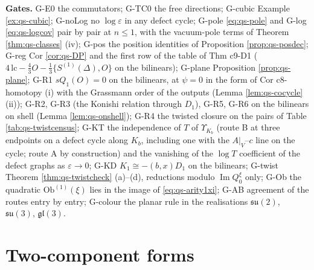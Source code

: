 \documentclass[11pt]{article}
\numberwithin{equation}{section}
\theoremstyle{plain}
\theoremstyle{definition}
\newcommand{\AV}{A|_V}
\begin{document}
\textbf{Gates.} G-E0 the commutators; G-TC0 the free directions; G-cubic Example \ref{ex:qs-cubic}; G-noLog no $\log\varepsilon$ in any defect cycle; G-pole \eqref{eq:qs-pole} and G-log \eqref{eq:qs-logcov} pair by pair at $n\le1$, with the vacuum-pole terms of Theorem \ref{thm:qs-classes} (iv); G-pos the position identities of Proposition \ref{prop:qs-posdec}; G-reg Cor \ref{cor:qs-DP} and the first row of the table of Thm c9-D1 ($4\,\mathrm{lc}-\tfrac43O-\tfrac13\{S^{(1)}(\Delta),O\}$ on the bilinears); G-plane Proposition \ref{prop:qs-plane}; G-R1 $sQ_1(O)=0$ on the bilinears, at $\psi=0$ in the form of Cor c8-homotopy (i) with the Grassmann order of the outputs (Lemma \ref{lem:qs-cocycle} (ii)); G-R2, G-R3 (the Konishi relation through $D_1$), G-R5, G-R6 on the bilinears on shell (Lemma \ref{lem:qs-onshell}); G-R4 the twisted closure on the pairs of Table \ref{tab:qs-twistcensus}; G-KT the independence of $T$ of $\Upsilon_{K_b}$ (route B at three endpoints on a defect cycle along $K_b$, including one with the $\AV$--$c$ line on the cycle; route A by construction) and the vanishing of the $\log T$ coefficient of the defect graphs as $\varepsilon\to0$; G-KD $K_1\cong-(b,x)D_1$ on the bilinears; G-twist Theorem \ref{thm:qs-twistcheck} (a)--(d), reductions modulo $\operatorname{Im}Q^\xi_0$ only; G-Ob the quadratic $\mathrm{Ob}^{(1)}(\xi)$ lies in the image of \eqref{eq:qs-arity1xi}; G-AB agreement of the routes entry by entry; G-colour the planar rule in the realisations $\mathfrak{su}(2)$, $\mathfrak{su}(3)$, $\mathfrak{gl}(3)$.

\section{Two-component forms}
\label{sec:qs-twocomp}
\end{document}
